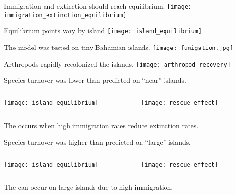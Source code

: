 \documentclass[t]{beamer}
\begin{document}
\begin{frame}{Immigration and extinction should reach equilibrium.}
	\centering
		\texttt{[image: immigration\_extinction\_equilibrium]}
\end{frame}

\begin{frame}{Equilibrium points vary by island }
	\centering
		\texttt{[image: island\_equilibrium]}
\end{frame}

\begin{frame}{The model was tested  on tiny Bahamian islands.}
	\centering
		\texttt{[image: fumigation.jpg]}
\end{frame}

\begin{frame}{Arthropods rapidly recolonized the islands.}
	\centering
		\texttt{[image: arthropod\_recovery]}
\end{frame}

\begin{frame}{Species turnover was lower than predicted on ``near'' islands.}
	\centering
	\begin{columns}[T]
		\begin{column}{0.4\textwidth}
			\texttt{[image: island\_equilibrium]}
		\end{column}
		\begin{column}{0.6\textwidth}
			\texttt{[image: rescue\_effect]}
		\end{column}
	\end{columns}
	\pause
	\pause
	\begin{center}
		The  occurs when high immigration rates reduce extinction rates.
	\end{center}
\end{frame}

\begin{frame}{Species turnover was higher than predicted on ``large'' islands.}
	\centering
	\begin{columns}[T]
		\begin{column}{0.4\textwidth}
			\texttt{[image: island\_equilibrium]}
		\end{column}
		\begin{column}{0.6\textwidth}
			\texttt{[image: rescue\_effect]}
		\end{column}
	\end{columns}

	The  can occur on large islands due to high immigration.

\end{frame}
\end{document}
